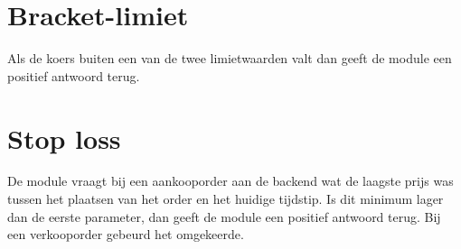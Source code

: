 \section{Bracket-limiet}
Als de koers buiten een van de twee limietwaarden valt dan geeft de module een positief antwoord terug.

\section{Stop loss}
De module vraagt bij een aankooporder aan de backend wat de laagste prijs was tussen het plaatsen van het order en het huidige tijdstip. Is dit minimum lager dan de eerste parameter, dan geeft de module een positief antwoord terug. Bij een verkooporder gebeurd het omgekeerde.
